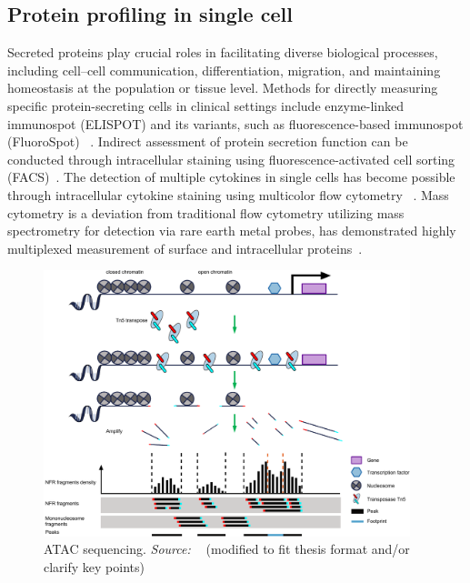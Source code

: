 \subsection{Protein profiling in single cell}
Secreted proteins play crucial roles in facilitating diverse biological processes, including cell–cell communication, differentiation, migration, and maintaining homeostasis at the population or tissue level. Methods for directly measuring specific protein-secreting cells in clinical settings include enzyme-linked immunospot (ELISPOT) and its variants, such as fluorescence-based immunospot (FluoroSpot) ~\citep{perfetto2004seventeen, karlsson2003comparison}. Indirect assessment of protein secretion function can be conducted through intracellular staining using fluorescence-activated cell sorting (FACS)~\citep{bonner1972fluorescence}. The detection of multiple cytokines in single cells has become possible through intracellular cytokine staining using multicolor flow cytometry ~\citep{irish2004single,hale2009stage}. Mass cytometry is a deviation from traditional flow cytometry utilizing mass spectrometry for detection via rare earth metal probes, has demonstrated highly multiplexed measurement of surface and intracellular proteins~\citep{spitzer2016mass}.


\begin{figure}[!ht]
	\centering
	\includegraphics[width=0.95\textwidth]{ATAC-seq/fig}
	\vspace{0.1cm}
	\caption[ATAC sequenceing.]{ATAC sequencing. \emph{Source: ~\cite{yan2020reads}} (modified to fit thesis format and/or clarify key points)}
	\label{fig:ATAC-seq}
\end{figure}


